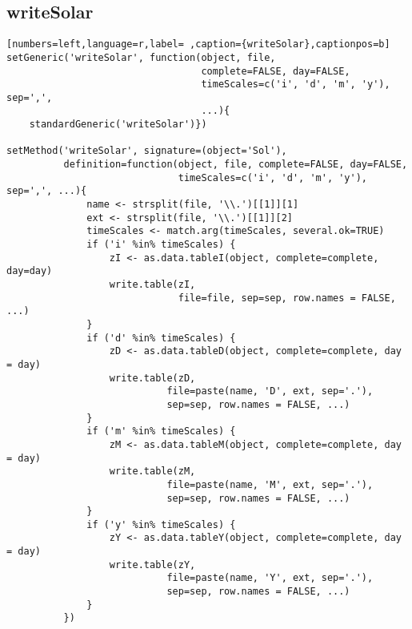 \subsection{writeSolar}
\label{sec:org359a182}
\begin{lstlisting}[numbers=left,language=r,label= ,caption={writeSolar},captionpos=b]
setGeneric('writeSolar', function(object, file,
                                  complete=FALSE, day=FALSE,
                                  timeScales=c('i', 'd', 'm', 'y'), sep=',',
                                  ...){
    standardGeneric('writeSolar')})

setMethod('writeSolar', signature=(object='Sol'),
          definition=function(object, file, complete=FALSE, day=FALSE,
                              timeScales=c('i', 'd', 'm', 'y'), sep=',', ...){
              name <- strsplit(file, '\\.')[[1]][1]
              ext <- strsplit(file, '\\.')[[1]][2]
              timeScales <- match.arg(timeScales, several.ok=TRUE)
              if ('i' %in% timeScales) {
                  zI <- as.data.tableI(object, complete=complete, day=day)
                  write.table(zI,
                              file=file, sep=sep, row.names = FALSE, ...)
              }
              if ('d' %in% timeScales) {
                  zD <- as.data.tableD(object, complete=complete, day = day)
                  write.table(zD,
                            file=paste(name, 'D', ext, sep='.'),
                            sep=sep, row.names = FALSE, ...)
              }
              if ('m' %in% timeScales) {
                  zM <- as.data.tableM(object, complete=complete, day = day)
                  write.table(zM,
                            file=paste(name, 'M', ext, sep='.'),
                            sep=sep, row.names = FALSE, ...)
              }
              if ('y' %in% timeScales) {
                  zY <- as.data.tableY(object, complete=complete, day = day)
                  write.table(zY,
                            file=paste(name, 'Y', ext, sep='.'),
                            sep=sep, row.names = FALSE, ...)
              }
          })
\end{lstlisting}
